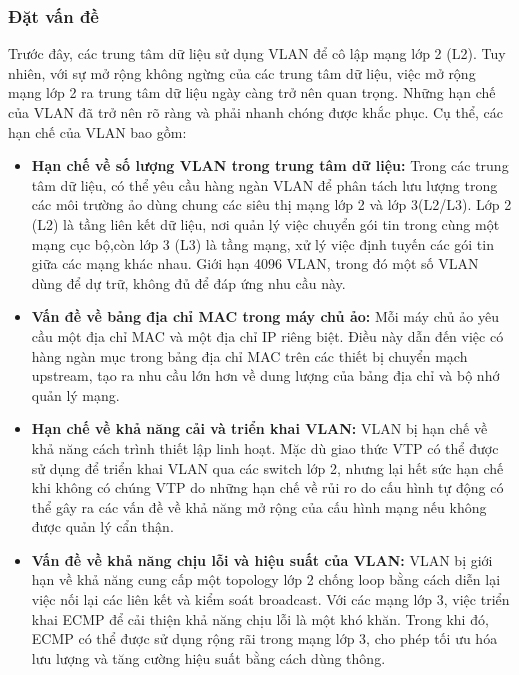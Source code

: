 \documentclass[13pt]{article}
\begin{document}
\subsubsection{Đặt vấn đề}
Trước đây, các trung tâm dữ liệu sử dụng VLAN để cô lập mạng lớp 2 (L2). Tuy nhiên, với sự mở rộng không ngừng của các trung tâm dữ liệu, việc mở rộng mạng lớp 2 ra trung tâm dữ liệu ngày càng trở nên quan trọng. Những hạn chế của VLAN đã trở nên rõ ràng và phải nhanh chóng được khắc phục. Cụ thể, các hạn chế của VLAN bao gồm:
\begin{itemize}
    \item \textbf{Hạn chế về số lượng VLAN trong trung tâm dữ liệu:} Trong các trung tâm dữ liệu, có thể yêu cầu hàng ngàn VLAN để phân tách lưu lượng trong các môi trường ảo dùng chung các siêu thị mạng lớp 2 và lớp 3(L2/L3). Lớp 2 (L2) là tầng liên kết dữ liệu, nơi quản lý việc chuyển gói tin trong cùng một mạng cục bộ,còn lớp 3 (L3) là tầng mạng, xử lý việc định tuyến các gói tin giữa các mạng khác nhau. Giới hạn 4096 VLAN, trong đó một số VLAN dùng để dự trữ, không đủ để đáp ứng nhu cầu này.
    \item \textbf{Vấn đề về bảng địa chỉ MAC trong máy chủ ảo:} Mỗi máy chủ ảo yêu cầu một địa chỉ MAC và một địa chỉ IP riêng biệt. Điều này dẫn đến việc có hàng ngàn mục trong bảng địa chỉ MAC trên các thiết bị chuyển mạch upstream, tạo ra nhu cầu lớn hơn về dung lượng của bảng địa chỉ và bộ nhớ quản lý mạng.
    \item \textbf{Hạn chế về khả năng cải và triển khai VLAN:} VLAN bị hạn chế về khả năng cách trình thiết lập linh hoạt. Mặc dù giao thức VTP có thể được sử dụng để triển khai VLAN qua các switch lớp 2, nhưng lại hết sức hạn chế khi không có chúng VTP do những hạn chế về rủi ro do cấu hình tự động có thể gây ra các vấn đề về khả năng mở rộng của cấu hình mạng nếu không được quản lý cẩn thận.
    \item \textbf{Vấn đề về khả năng chịu lỗi và hiệu suất của VLAN:} VLAN bị giới hạn về khả năng cung cấp một topology lớp 2 chống loop bằng cách diễn lại việc nối lại các liên kết và kiểm soát broadcast. Với các mạng lớp 3, việc triển khai ECMP để cải thiện khả năng chịu lỗi là một khó khăn. Trong khi đó, ECMP có thể được sử dụng rộng rãi trong mạng lớp 3, cho phép tối ưu hóa lưu lượng và tăng cường hiệu suất bằng cách dùng thông.
\end{itemize}
\end{document}
